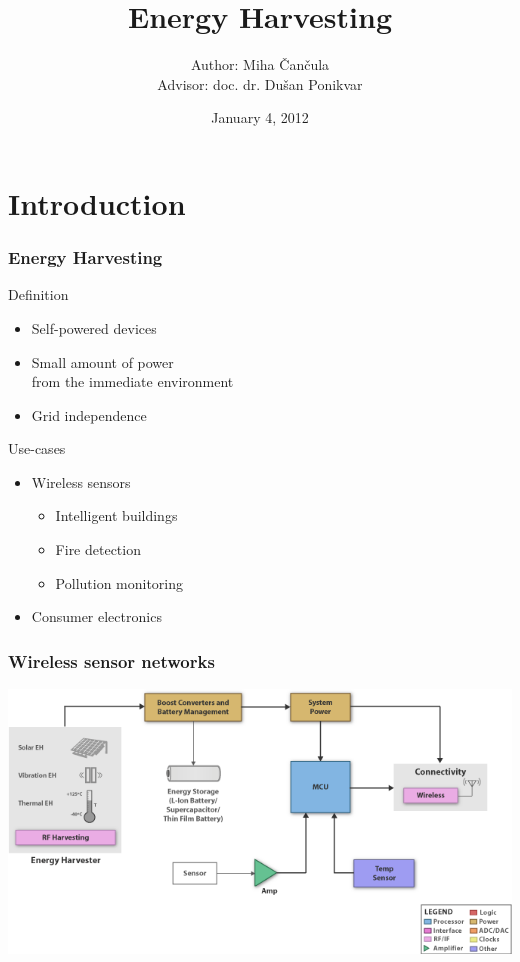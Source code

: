 \documentclass{beamer}
\title{Energy Harvesting}
\author{Author: Miha \v Can\v cula \\
  Advisor: doc. dr. Du\v san Ponikvar}
\institute{Faculty of Mathematics and Physics \\ University of Ljubljana}
\date{January 4, 2012}
\begin{document}
\frame{\titlepage}

\section{Introduction}

\begin{frame}
  \frametitle{Energy Harvesting}

\begin{block}{Definition}
  \begin{itemize}
    \item Self-powered devices
    \item Small amount of power \\ from the immediate environment
    \item Grid independence
  \end{itemize}
\end{block}

\begin{block}{Use-cases}
  \begin{itemize}
    \item Wireless sensors
    \begin{itemize}
      \item{Intelligent buildings}
      \item{Fire detection}
      \item{Pollution monitoring}
    \end{itemize}
    \item Consumer electronics
  \end{itemize}
\end{block}

\end{frame}

\begin{frame}
  \frametitle{Wireless sensor networks}

\begin{center}
 \includegraphics[width=\textwidth]{./Slike/EH-Block}
\end{center}

\end{frame}
\end{document}
